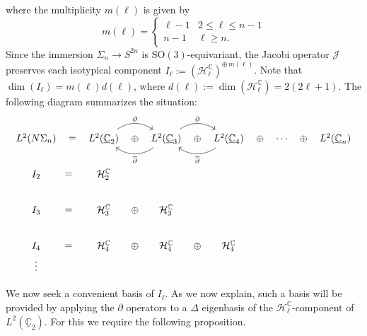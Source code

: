 \documentclass[11pt]{article}
\newcommand{\SO}{\mathrm{SO}}
\newcommand{\C}{\mathbb{C}}
\newcommand{\Hc}{\mathcal{H}}
\theoremstyle{definition}
\numberwithin{equation}{section}
\begin{document}
where the multiplicity $m(\ell)$ is given by
\begin{equation*}
    m(\ell) = \begin{cases}
        \ell - 1 & 2 \leq \ell \leq n - 1 \\
        n - 1 & \ell \geq n.
    \end{cases}
\end{equation*}
Since the immersion $\Sigma_n \to S^{2n}$ is $\SO(3)$-equivariant, the Jacobi operator $\mathscr{J}$ preserves each isotypical component $I_\ell := \left(\Hc_\ell^\C\right) ^{\oplus\, m(\ell)}$.  Note that $\dim(I_\ell) = m(\ell) d(\ell)$, where $d(\ell) := \dim(\Hc_\ell^\C) = 2(2\ell + 1)$.  The following diagram summarizes the situation:
$$\begin{tikzcd}
{L^2(N\Sigma_n)} \arrow[r, "=", phantom]       & L^2(\underline{\mathbb{C}}_2) \arrow[r, "\oplus", phantom] \arrow[r, "\partial", bend left=35]  & L^2(\underline{\mathbb{C}}_3) \arrow[r, "\oplus", phantom] \arrow[r, "\partial", bend left=35] \arrow[l, "\overline{\partial}", bend left=35] & L^2(\underline{\mathbb{C}}_4) \arrow[r, "\oplus", phantom] \arrow[l, "\overline{\partial}", bend left=35] & \cdots \arrow[r, "\oplus", phantom] & L^2(\underline{\mathbb{C}}_n) \\
I_2 \arrow[r, "=", phantom]                              & \mathcal{H}_2^{\mathbb{C}}                                                                     &                                                                                                &                                                            &                                     &                               \\
I_3 \arrow[r, "=", phantom]                              & \mathcal{H}_3^{\mathbb{C}} \arrow[r, "\oplus", phantom]                                        & \mathcal{H}_3^{\mathbb{C}}                                                                     &                                                            &                                     &                               \\
I_4 \arrow[r, "=", phantom] \arrow[d, "\vdots", phantom] & \mathcal{H}_4^{\mathbb{C}} \arrow[r, "\oplus", phantom]                                        & \mathcal{H}_4^{\mathbb{C}} \arrow[r, "\oplus", phantom]                                        & \mathcal{H}_4^{\mathbb{C}}                                 &                                     &                               \\
{}                                                       &                                                                                                &                                                                                                &                                                            &                                     &                              
\end{tikzcd}$$
\indent We now seek a convenient basis of $I_\ell$.  As we now explain, such a basis will be provided by applying the $\partial$ operators to a $\Delta$ eigenbasis of the $\mathcal{H}_\ell^\C$-component of $L^2(\underline{\C}_2)$.  For this we require the following proposition.
\end{document}
